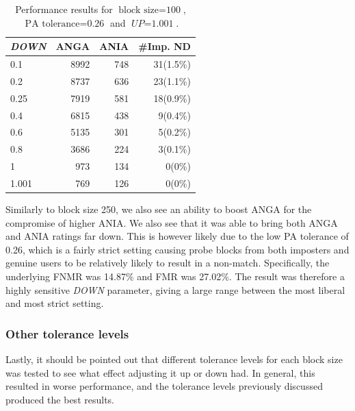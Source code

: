 \begin{table}[ht]
\centering
\begin{tabular}{lrrr}
\hline
\textit{DOWN} & ANGA  & ANIA & \#Imp. ND \\ \hline
0.1   & 8992 & 748 & 31(1.5\%) \\
0.2   & 8737 & 636 & 23(1.1\%) \\
0.25  & 7919 & 581 & 18(0.9\%) \\
0.4   & 6815 & 438 & 9(0.4\%)  \\
0.6   & 5135 & 301 & 5(0.2\%)  \\
0.8   & 3686 & 224 & 3(0.1\%)  \\
1     & 973  & 134 & 0(0\%)    \\
1.001 & 769  & 126 & 0(0\%)  
\end{tabular}
\caption{Performance results for $\text{block size} = \text{100}$, $\text{PA tolerance} = \text{0.26}$ and $\textit{UP} = \text{1.001}$.}
\label{tab:decision-level-BL100}
\end{table}

Similarly to block size 250, we also see an ability to boost ANGA for the compromise of higher ANIA.
We also see that it was able to bring both ANGA and ANIA ratings far down.
This is however likely due to the low PA tolerance of 0.26, which is a fairly strict setting causing probe blocks from both imposters and genuine users to be relatively likely to result in a non-match. 
Specifically, the underlying FNMR was 14.87\% and FMR was 27.02\%.
The result was therefore a highly sensitive \textit{DOWN} parameter, giving a large range between the most liberal and most strict setting.

\subsubsection{Other tolerance levels}
Lastly, it should be pointed out that different tolerance levels for each block size was tested to see what effect adjusting it up or down had.
In general, this resulted in worse performance, and the tolerance levels previously discussed produced the best results.

%
%

